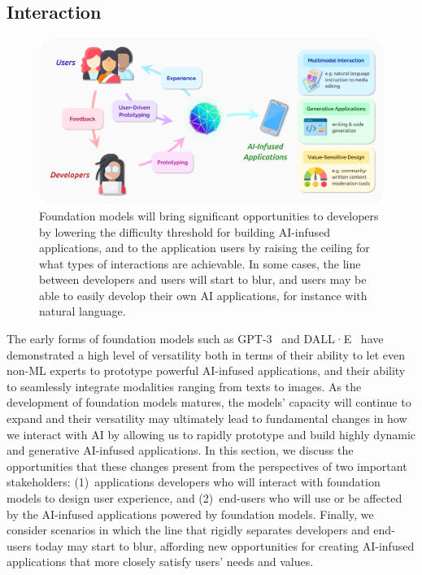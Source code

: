 \newsection
\subsection{Interaction}
\label{sec:interaction}

\begin{figure}[!ht]
\centering
\includegraphics[width=\linewidth]{capabilities/figures/Interaction.png}
\caption{\label{fig:interaction} Foundation models will bring significant opportunities to developers by lowering the difficulty threshold for building AI-infused applications, and to the application users by raising the ceiling for what types of interactions are achievable. In some cases, the line between developers and users will start to blur, and users may be able to easily develop their own AI applications, for instance with natural language.}
\end{figure}

The early forms of foundation models such as GPT-3~\citep{brown2020gpt3} and DALL·E~\citep{ramesh2021zeroshot} have demonstrated a high level of versatility both in terms of their ability to let even non-ML experts to prototype powerful AI-infused applications, and their ability to seamlessly integrate modalities ranging from texts to images. As the development of foundation models matures, the models' capacity will continue to expand and their versatility may ultimately lead to fundamental changes in how we interact with AI by allowing us to rapidly prototype and build highly dynamic and generative AI-infused applications. In this section, we discuss the opportunities that these changes present from the perspectives of two important stakeholders: (1)~applications developers who will interact with foundation models to design user experience, and (2)~end-users who will use or be affected by the AI-infused applications powered by foundation models. Finally, we consider scenarios in which the line that rigidly separates developers and end-users today may start to blur, affording new opportunities for creating AI-infused applications that more closely satisfy users' needs and values.

